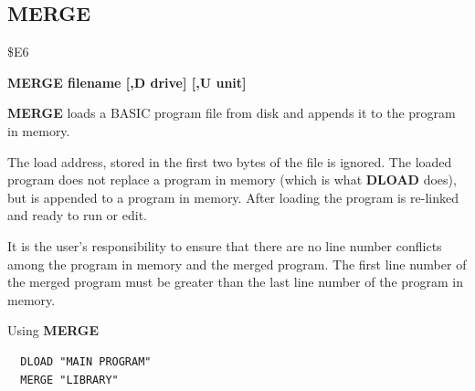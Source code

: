 \subsection{MERGE}
\begin{description}[leftmargin=2cm,style=nextline]
\item [Token:] \$E6
\item [Format:] {\bf MERGE filename [,D drive] [,U unit] }
\item [Usage:] {\bf MERGE} loads a BASIC program file from disk
               and appends it to the program in memory.

   \filenamedefinition

   \drivedefinition

   \unitdefinition

\item [Remarks:]
   The load address, stored in the first two bytes
   of the file is ignored. The loaded program does not
   replace a program in memory (which is what {\bf DLOAD} does),
   but is appended to a program in memory.
   After loading the program is re-linked
   and ready to run or edit.

   It is the user's responsibility to ensure that there
   are no line number conflicts among the program in memory and
   the merged program. The first line number of the merged
   program must be greater than the last line number of the
   program in memory.

\item [Example:] Using {\bf MERGE}
\begin{tcolorbox}[colback=black,coltext=white]
\verbatimfont{\codefont}
\begin{verbatim}
  DLOAD "MAIN PROGRAM"
  MERGE "LIBRARY"
\end{verbatim}
\end{tcolorbox}
\end{description}


\newpage
